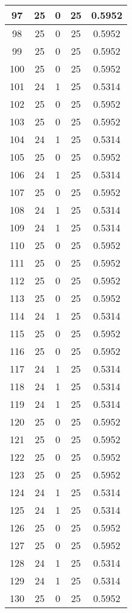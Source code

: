 \documentclass[letterpaper, 12pt]{article}
\begin{document}
\begin{longtable}{|c|c|c|c|c|}
\hline
97 & 25 & 0 & 25 & 0.5952 \\
\hline
98 & 25 & 0 & 25 & 0.5952 \\
\hline
99 & 25 & 0 & 25 & 0.5952 \\
\hline
100 & 25 & 0 & 25 & 0.5952 \\
\hline
101 & 24 & 1 & 25 & 0.5314 \\
\hline
102 & 25 & 0 & 25 & 0.5952 \\
\hline
103 & 25 & 0 & 25 & 0.5952 \\
\hline
104 & 24 & 1 & 25 & 0.5314 \\
\hline
105 & 25 & 0 & 25 & 0.5952 \\
\hline
106 & 24 & 1 & 25 & 0.5314 \\
\hline
107 & 25 & 0 & 25 & 0.5952 \\
\hline
108 & 24 & 1 & 25 & 0.5314 \\
\hline
109 & 24 & 1 & 25 & 0.5314 \\
\hline
110 & 25 & 0 & 25 & 0.5952 \\
\hline
111 & 25 & 0 & 25 & 0.5952 \\
\hline
112 & 25 & 0 & 25 & 0.5952 \\
\hline
113 & 25 & 0 & 25 & 0.5952 \\
\hline
114 & 24 & 1 & 25 & 0.5314 \\
\hline
115 & 25 & 0 & 25 & 0.5952 \\
\hline
116 & 25 & 0 & 25 & 0.5952 \\
\hline
117 & 24 & 1 & 25 & 0.5314 \\
\hline
118 & 24 & 1 & 25 & 0.5314 \\
\hline
119 & 24 & 1 & 25 & 0.5314 \\
\hline
120 & 25 & 0 & 25 & 0.5952 \\
\hline
121 & 25 & 0 & 25 & 0.5952 \\
\hline
122 & 25 & 0 & 25 & 0.5952 \\
\hline
123 & 25 & 0 & 25 & 0.5952 \\
\hline
124 & 24 & 1 & 25 & 0.5314 \\
\hline
125 & 24 & 1 & 25 & 0.5314 \\
\hline
126 & 25 & 0 & 25 & 0.5952 \\
\hline
127 & 25 & 0 & 25 & 0.5952 \\
\hline
128 & 24 & 1 & 25 & 0.5314 \\
\hline
129 & 24 & 1 & 25 & 0.5314 \\
\hline
130 & 25 & 0 & 25 & 0.5952 \\

\end{longtable}
\end{document}
